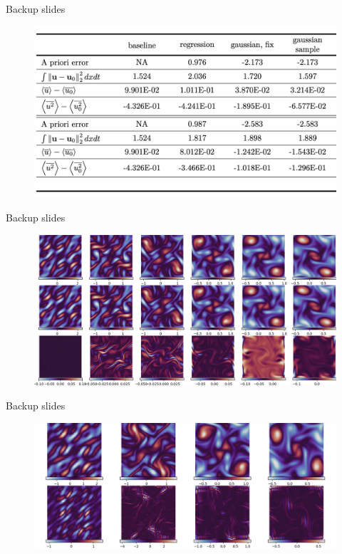 \documentclass[aspectratio=169]{beamer}
\begin{document}
\begin{frame}{Backup slides}
	\begin{figure}[ht] 
		\centering 
		\includegraphics[width=\textwidth]{fig/table.jpg} 
	\end{figure}
\end{frame}


\begin{frame}{Backup slides}
	\begin{figure}[ht] 
		\centering 
		\includegraphics[width=\textwidth]{fig/sim_ns_hit_coarse_correction_ols_unet.png} 
	\end{figure}
\end{frame}


\begin{frame}{Backup slides}
	\begin{figure}[ht] 
		\centering 
		\includegraphics[width=\textwidth]{fig/dataset_filter.png} 
	\end{figure}
\end{frame}
\end{document}
